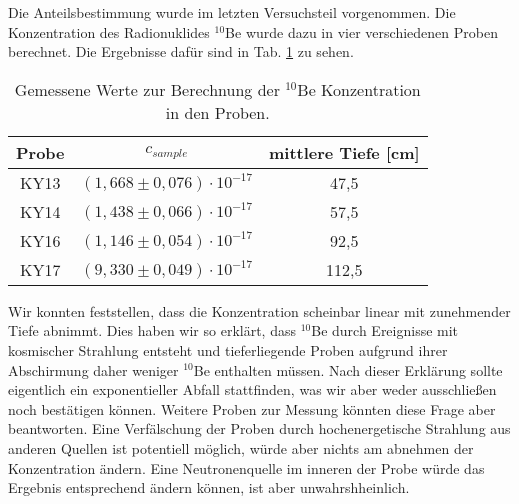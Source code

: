 Die Anteilsbestimmung wurde im letzten Versuchsteil vorgenommen.
Die Konzentration des Radionuklides $^{10}$Be wurde dazu in vier verschiedenen Proben berechnet.
Die Ergebnisse dafür sind in Tab. \ref{dis_con} zu sehen.
\begin{table}[h]
\centering
\caption{Gemessene Werte zur Berechnung der $^{10}$Be Konzentration in den Proben.}
\begin{tabular}{|c |c| c|}
\hline
Probe& $c_{sample}$ & mittlere Tiefe [cm] \\
\hline
KY13 &  $(1,668 \pm 0,076) \cdot 10^{-17}$ & 47,5\\
KY14 &  $(1,438 \pm 0,066) \cdot 10^{-17}$ & 57,5 \\
KY16 &  $(1,146 \pm 0,054) \cdot 10^{-17}$ & 92,5\\
KY17 &  $(9,330 \pm 0,049) \cdot 10^{-17}$ & 112,5\\
\hline
\end{tabular}
\label{dis_con}
\end{table}
Wir konnten feststellen, dass die Konzentration scheinbar linear mit zunehmender Tiefe abnimmt.
Dies haben wir so erklärt, dass $^{10}$Be durch Ereignisse mit kosmischer Strahlung entsteht und tieferliegende Proben aufgrund ihrer Abschirmung daher weniger $^{10}$Be enthalten müssen.
Nach dieser Erklärung sollte eigentlich ein exponentieller Abfall stattfinden, was wir aber weder ausschließen noch bestätigen können.
Weitere Proben zur Messung könnten diese Frage aber beantworten.
Eine Verfälschung der Proben durch hochenergetische Strahlung aus anderen Quellen ist potentiell möglich, würde aber nichts am abnehmen der Konzentration ändern.
Eine Neutronenquelle im inneren der Probe würde das Ergebnis entsprechend ändern können, ist aber unwahrshheinlich.
